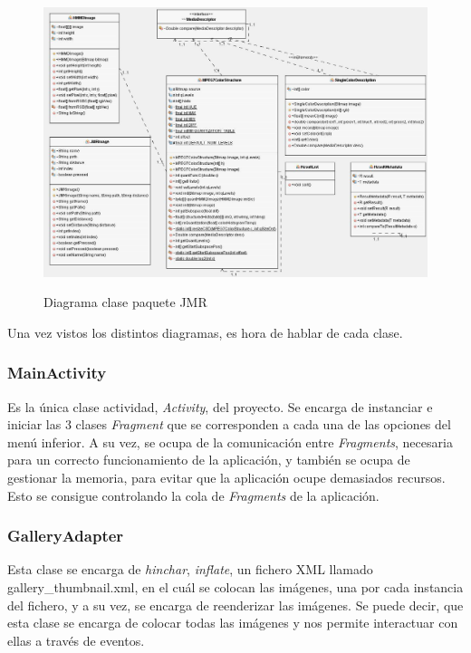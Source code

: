 \begin{figure}[H] %
\centering
\includegraphics[scale=0.6]{imagenes/diagrama5.jpg}  %
\label{diagrama5}
\caption{Diagrama clase paquete JMR}
\end{figure}

Una vez vistos los distintos diagramas, es hora de hablar de cada clase.


\subsubsection{MainActivity}

Es la única clase actividad, \textit{Activity}, del proyecto. Se encarga de instanciar e iniciar las 3 clases \textit{Fragment} que se corresponden a cada una de las opciones del menú inferior. A su vez, se ocupa de la comunicación entre \textit{Fragments}, necesaria para un correcto funcionamiento de la aplicación, y también se ocupa de gestionar la memoria, para evitar que la aplicación ocupe demasiados recursos. Esto se consigue controlando la cola de \textit{Fragments} de la aplicación.

\subsubsection{GalleryAdapter}

Esta clase se encarga de \textit{hinchar}, \textit{inflate}, un fichero XML llamado gallery\_thumbnail.xml, en el cuál se colocan las imágenes, una por cada instancia del fichero, y a su vez, se encarga de reenderizar las imágenes. Se puede decir, que esta clase se encarga de colocar todas las imágenes y nos permite interactuar con ellas a través de eventos.

